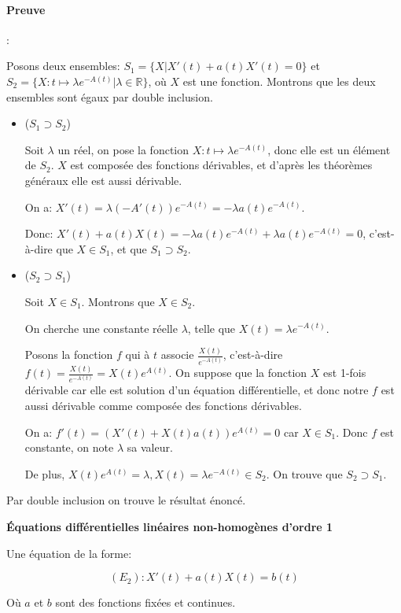 \documentclass{article}
\begin{document}
\paragraph{Preuve}: \space

Posons deux ensembles: $S_{1} = \{ X | X'(t) + a(t)X'(t) = 0\}$ et $ S_{2} = \{ X : t \mapsto \lambda e^{-A(t)} | \lambda \in \mathbb{R}\}$, où $X$ est une fonction. Montrons que les deux ensembles sont égaux par double inclusion.


\begin{itemize}
 \item ($S_{1} \supset S_{2}$)
 
 Soit $\lambda$ un réel, on pose la fonction $X: t \mapsto \lambda e^{-A(t)}$, donc elle est un élément de $S_{2}$. $X$ est composée des fonctions dérivables, et d'après les théorèmes généraux elle est aussi dérivable.
 
 On a: $X'(t) = \lambda (-A'(t))e^{-A(t)} = - \lambda a(t) e^{-A(t)}$.
 
 Donc: $X'(t) + a(t)X(t) = - \lambda a(t) e^{-A(t)} + \lambda a(t) e^{-A(t)} = 0$, c'est-à-dire que $X \in S_{1}$, et que $S_{1} \supset S_{2}$.

 \item ($S_{2} \supset S_{1}$)
 
 Soit $X \in S_{1}$. Montrons que $X \in S_{2}$.
 
 On cherche une constante réelle $\lambda$, telle que $X(t) = \lambda e^{-A(t)}$.
 
 Posons la fonction $f$ qui à $t$ associe $\frac{X(t)}{e^{-A(t)}}$, c'est-à-dire $f(t) = \frac{X(t)}{e^{-A(t)}} = X(t)e^{A(t)}$. On suppose que la fonction $X$ est 1-fois dérivable car elle est solution d'un équation différentielle, et donc notre $f$ est aussi dérivable comme composée des fonctions dérivables.
 
 On a: $f'(t) = (X'(t) + X(t)a(t))e^{A(t)} = 0$ car $X \in S_{1}$. Donc $f$ est constante, on note $\lambda$ sa valeur.
 
 De plus, $X(t)e^{A(t)} = \lambda, X(t) = \lambda e^{-A(t)} \in S_{2}$. On trouve que $S_{2} \supset S_{1}$.

\end{itemize}

Par double inclusion on trouve le résultat énoncé.


\begin{tcolorbox}[colback=gray!5!white,colframe=gray!75!black,title=Rappel 1.2]

\textbf{Équations différentielles linéaires non-homogènes d'ordre 1}

Une équation de la forme:

\[
(E_{2}) : X'(t) + a(t)X(t) = b(t)
\] 

Où $a$ et $b$ sont des fonctions fixées et continues.


\end{tcolorbox}
\end{document}
